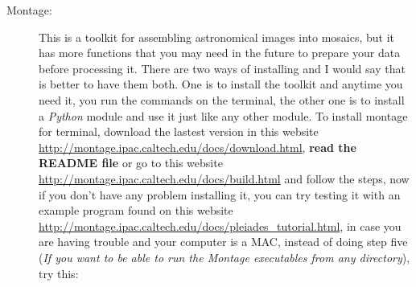 \documentclass[11pt,fleqn]{book} %
\begin{document}
\begin{description}
																																																																																																																																						    \item[Montage: ]This is a toolkit for assembling astronomical images into mosaics, but it has more functions that you may need in the future to prepare your data before processing it. There are two ways of installing and I would say that is better to have them both. One is to install the toolkit and anytime you need it, you run the commands on the terminal, the other one is to install a \emph{Python} module and use it just like any other module.
																																																																																																																																						        To install montage for terminal, download the lastest version in this website \url{http://montage.ipac.caltech.edu/docs/download.html}, \textbf{read the README file} or go to this website \url{http://montage.ipac.caltech.edu/docs/build.html} and follow the steps, now if you don't have any problem installing it, you can try testing it with an example program found on this website \url{http://montage.ipac.caltech.edu/docs/pleiades_tutorial.html}, in case you are having trouble and your computer is a MAC, instead of doing step five (\emph{If you want to be able to run the Montage executables from any directory}), try this:
																																																																																																																																							    

\end{description}
\end{document}
